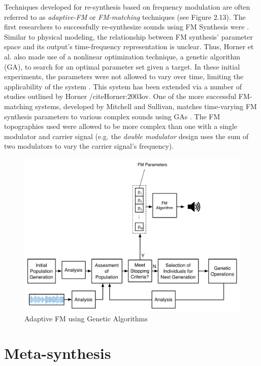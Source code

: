 \documentclass[a4paper,12pt]{report} 	%
\numberwithin{figure}{chapter}
\numberwithin{table}{chapter}
\numberwithin{equation}{chapter}
\begin{document}
\begin{flushleft}
Techniques developed for re-synthesis based on frequency modulation are often referred to as \emph{adaptive-FM} or \emph{FM-matching} techniques (see Figure 2.13). The first researchers to successfully re-synthesize sounds using FM Synthesis were \cite{Horner:1993il}. Similar to physical modeling, the relationship between FM synthesis' parameter space and its output's time-frequency representation is unclear. Thus, Horner et al. also made use of a nonlinear optimization technique, a genetic algorithm (GA), to search for an optimal parameter set given a target. In these initial experiments, the parameters were not allowed to vary over time, limiting the applicability of the system \cite[p. 22]{Horner:1993il}. This system has been extended via a number of studies outlined by Horner /cite{Horner:2003ov}. One of the more successful FM-matching systems, developed by Mitchell and Sullivan, matches time-varying FM synthesis parameters to various complex sounds using GAs \cite{Mitchell:2005ez}. The FM topographies used were allowed to be more complex than one with a single modulator and carrier signal (e.g. the \emph{double modulator} design uses the sum of two modulators to vary the carrier signal's frequency).
\\
\begin{figure}[h!]
\begin{center}
\includegraphics[scale=0.50]{AdaptiveFM}
\caption[Adaptive FM]{Adaptive FM using Genetic Algorithms}
\end{center}
\end{figure}

\section{Meta-synthesis}


\end{flushleft}
\end{document}
